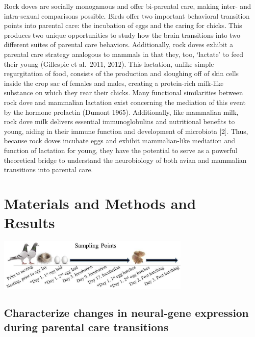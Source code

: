 \documentclass[10pt,letterpaper]{article}
\begin{document}
Rock doves are socially monogamous and offer bi-parental care, making
inter- and intra-sexual comparisons possible. Birds offer two important
behavioral transition points into parental care: the incubation of eggs
and the caring for chicks. This produces two unique opportunities to
study how the brain transitions into two different suites of parental
care behaviors. Additionally, rock doves exhibit a parental care
strategy analogous to mammals in that they, too, `lactate' to feed their
young (Gillespie et al.~2011, 2012). This lactation, unlike simple
regurgitation of food, consists of the production and sloughing off of
skin cells inside the crop sac of females and males, creating a
protein-rich milk-like substance on which they rear their chicks. Many
functional similarities between rock dove and mammalian lactation exist
concerning the mediation of this event by the hormone prolactin (Dumont
1965). Additionally, like mammalian milk, rock dove milk delivers
essential immunoglobulins and nutritional benefits to young, aiding in
their immune function and development of microbiota {[}2{]}. Thus,
because rock doves incubate eggs and exhibit mammalian-like mediation
and function of lactation for young, they have the potential to serve as
a powerful theoretical bridge to understand the neurobiology of both
avian and mammalian transitions into parental care.

\hypertarget{materials-and-methods-and-results}{%
\section{Materials and Methods and
Results}\label{materials-and-methods-and-results}}

\includegraphics[width=360px]{../figures/images/samplingtimepoints}

\hypertarget{characterize-changes-in-neural-gene-expression-during-parental-care-transitions}{%
\subsection{Characterize changes in neural-gene expression during
parental care
transitions}\label{characterize-changes-in-neural-gene-expression-during-parental-care-transitions}}
\end{document}
